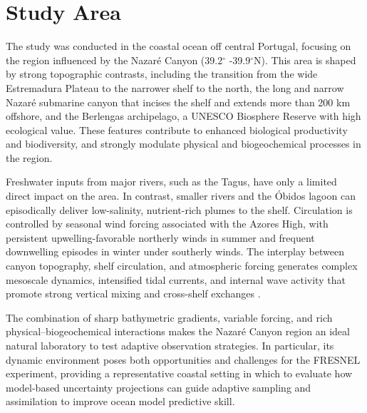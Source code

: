 \section{Study Area}

The study was conducted in the coastal ocean off central Portugal, focusing on the region influenced by the Nazaré Canyon (39.2$^{\circ}$ -39.9$^{\circ}$N). This area is shaped by strong topographic contrasts, including the transition from the wide Estremadura Plateau to the narrower shelf to the north, the long and narrow Nazaré submarine canyon that incises the shelf and extends more than 200 km offshore, and the Berlengas archipelago, a UNESCO Biosphere Reserve with high ecological value. These features contribute to enhanced biological productivity and biodiversity, and strongly modulate physical and biogeochemical processes in the region.

Freshwater inputs from major rivers, such as the Tagus, have only a limited direct impact on the area. In contrast, smaller rivers and the Óbidos lagoon can episodically deliver low-salinity, nutrient-rich plumes to the shelf. Circulation is controlled by seasonal wind forcing associated with the Azores High, with persistent upwelling-favorable northerly winds in summer and frequent downwelling episodes in winter under southerly winds. The interplay between canyon topography, shelf circulation, and atmospheric forcing generates complex mesoscale dynamics, intensified tidal currents, and internal wave activity that promote strong vertical mixing and cross-shelf exchanges \cite{martins10,quaresma07}.

The combination of sharp bathymetric gradients, variable forcing, and rich physical–biogeochemical interactions makes the Nazaré Canyon region an ideal natural laboratory to test adaptive observation strategies. In particular, its dynamic environment poses both opportunities and challenges for the FRESNEL experiment, providing a representative coastal setting in which to evaluate how model-based uncertainty projections can guide adaptive sampling and assimilation to improve ocean model predictive skill.